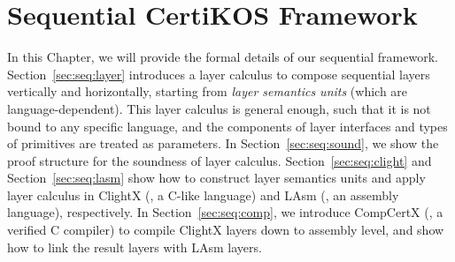 \chapter{Sequential CertiKOS Framework}
\label{chap:seq}
In this Chapter, we will provide the formal details
of our sequential \CTOS{} framework.
Section~\ref{sec:seq:layer} introduces
a layer calculus to compose
sequential layers vertically and
horizontally, starting from \emph{layer semantics units}
(which are language-dependent).
This layer calculus is general enough,
such that it is not bound to any specific language,
and the components of layer interfaces
and types of primitives are treated as parameters. 
In Section~\ref{sec:seq:sound},
we show the proof structure for the soundness of layer calculus.
Section~\ref{sec:seq:clight}
and Section~\ref{sec:seq:lasm}
show how to construct layer semantics units
and apply layer calculus
in ClightX (\ie, a C-like language) and LAsm (\ie, an assembly language), respectively.
In Section~\ref{sec:seq:comp},
we introduce CompCertX (\ie, a verified C compiler)
to compile ClightX layers down to assembly level,
and show how to link the result layers with
LAsm layers.




